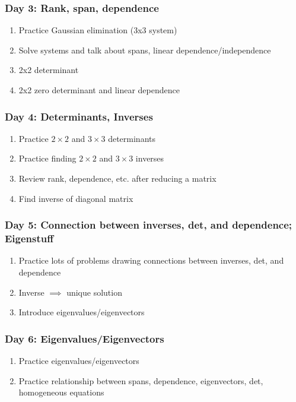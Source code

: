 \subsubsection*{Day 3: Rank, span, dependence}
\label{sec:day-3:-rank}

\begin{enumerate}
\item Practice Gaussian elimination (3x3 system)
\item Solve systems and talk about spans, linear dependence/independence
\item 2x2 determinant
\item 2x2 zero determinant and linear dependence
\end{enumerate}

\subsubsection*{Day 4: Determinants, Inverses}
\label{sec:day-4:-determinants}

\begin{enumerate}
\item Practice $2\times 2$ and $3\times 3$ determinants
\item Practice finding $2\times 2$ and $3\times 3$ inverses
\item Review rank, dependence, etc. after reducing a matrix
\item Find inverse of diagonal matrix
\end{enumerate}


\subsubsection*{Day 5: Connection between inverses, det, and dependence; Eigenstuff}

\begin{enumerate}
\item Practice lots of problems drawing connections between inverses, det, and dependence
\item Inverse $\implies$ unique solution
\item Introduce eigenvalues/eigenvectors
\end{enumerate}

\subsubsection*{Day 6: Eigenvalues/Eigenvectors}
\label{sec:eigenv}

\begin{enumerate}
\item Practice eigenvalues/eigenvectors
\item Practice relationship between spans, dependence, eigenvectors, det, homogeneous equations
\end{enumerate}

 

